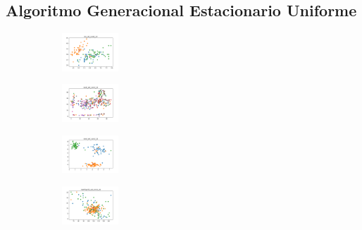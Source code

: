 \vspace*{\fill}
\newpage


\subsection{Algoritmo Generacional Estacionario Uniforme}

\begin{figure}[H]    
    \centering
    \begin{subfigure}
        \centering
        \includegraphics[width=0.234\textwidth]{img/ageun/iris_set_const_10_949004259_clust.png}
    \end{subfigure}
    \hfill
    \begin{subfigure}
        \centering
        \includegraphics[width=0.234\textwidth]{img/ageun/ecoli_set_const_10_949004259_clust.png}
    \end{subfigure}
    \hfill
    \begin{subfigure}
        \centering
        \includegraphics[width=0.234\textwidth]{img/ageun/rand_set_const_10_949004259_clust.png}
    \end{subfigure}
    \hfill
    \begin{subfigure}
        \centering
        \includegraphics[width=0.234\textwidth]{img/ageun/newthyroid_set_const_10_949004259_clust.png}

\end{subfigure}
\end{figure}
